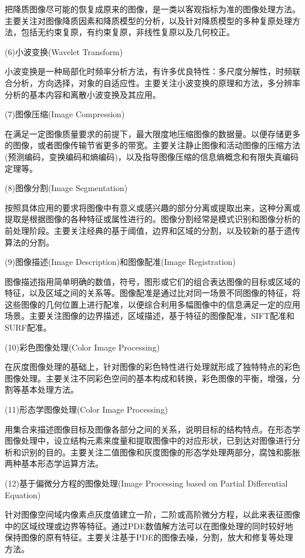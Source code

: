 \documentclass[11pt]{article}
\begin{document}
把降质图像尽可能的恢复成原来的图像，是一类以客观指标为准的图像处理方法。主要关注对图像降质因素和降质模型的分析，以及针对降质模型的多种复原处理方法，包括无约束复原，有约束复原，非线性复原以及几何校正。

(6)小波变换(Wavelet Transform)

小波变换是一种局部化时频率分析方法，有许多优良特性：多尺度分解性，时频联合分析，方向选择，对象的自适应性。主要关注小波变换的原理和方法，多分辨率分析的基本内容和离散小波变换及其应用。

(7)图像压缩(Image Compression)

在满足一定图像质量要求的前提下，最大限度地压缩图像的数据量。以便存储更多的图像，或者图像传输节省更多的带宽。主要关注静止图像和活动图像的压缩方法(预测编码，变换编码和熵编码)，以及指导图像压缩的信息熵概念和有限失真编码定理等。

(8)图像分割(Image Segmentation)

按照具体应用的要求将图像中有意义或感兴趣的部分分离或提取出来，这种分离或提取是根据图像的各种特征或属性进行的。图像分割经常是模式识别和图像分析的前处理阶段。主要关注经典的基于阈值，边界和区域的分割，以及较新的基于遗传算法的分割。

(9)图像描述(Image Description)和图像配准(Image Registration)

图像描述指用简单明确的数值，符号，图形或它们的组合表达图像的目标或区域的特征，以及区域之间的关系等。图像配准是通过比对同一场景不同图像的特征，将这些图像的几何位置上进行配准，以便综合利用多幅图像中的信息满足一定的应用场景。主要关注图像的边界描述，区域描述，基于特征的图像配准，SIFT配准和SURF配准。

(10)彩色图像处理(Color Image Processing)

在灰度图像处理的基础上，针对图像的彩色特性进行处理就形成了独特特点的彩色图像处理。主要关注不同彩色空间的基本构成和转换，彩色图像的平衡，增强，分割等基本处理方法。

(11)形态学图像处理(Color Image Processing)

用集合来描述图像目标及图像各部分之间的关系，说明目标的结构特点。在形态学图像处理中，设立结构元素来度量和提取图像中的对应形状，已到达对图像进行分析和识别的目的。主要关注二值图像和灰度图像的形态学处理两部分，腐蚀和膨胀两种基本形态学运算方法。

(12)基于偏微分方程的图像处理(Image Processing based on Partial Differential Equation)

针对图像空间域内像素点灰度值建立一阶，二阶或高阶微分方程，以此来表征图像中的区域纹理或边界等特征。通过PDE数值解方法可以在图像处理的同时较好地保持图像的原有特征。主要关注基于PDE的图像去噪，分割，放大和修复等处理方法。
\end{document}
